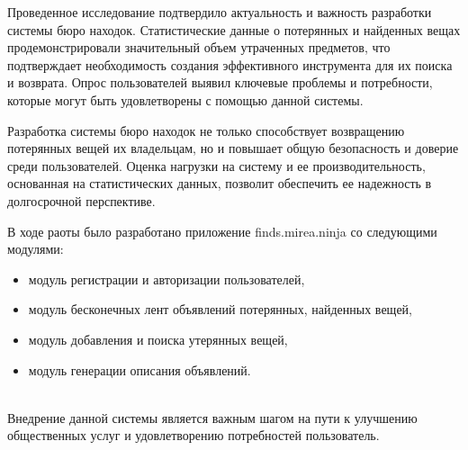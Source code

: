 \label{sec:conclusion}

Проведенное исследование подтвердило актуальность и важность разработки системы бюро находок. Статистические данные о потерянных и найденных вещах продемонстрировали значительный объем утраченных предметов, что подтверждает необходимость создания эффективного инструмента для их поиска и возврата. Опрос пользователей выявил ключевые проблемы и потребности, которые могут быть удовлетворены с помощью данной системы.

Разработка системы бюро находок не только способствует возвращению потерянных вещей их владельцам, но и повышает общую безопасность и доверие среди пользователей. Оценка нагрузки на систему и ее производительность, основанная на статистических данных, позволит обеспечить ее надежность в долгосрочной перспективе.

В ходе раоты было разработано приложение finds.mirea.ninja со следующими модулями:
\begin{itemize}
	\item модуль регистрации и авторизации пользователей,
	\item модуль бесконечных лент объявлений потерянных, найденных вещей,
	\item модуль добавления и поиска утерянных вещей,
	\item модуль генерации описания объявлений.
\end{itemize}\\

Внедрение данной системы является важным шагом на пути к улучшению общественных услуг и удовлетворению потребностей пользователь.